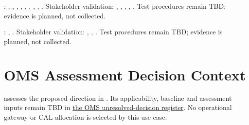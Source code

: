 : , , , , , , , , . Stakeholder validation: , , , , . Test procedures remain TBD; evidence is planned, not collected.

: , . Stakeholder validation: , , . Test procedures remain TBD; evidence is planned, not collected.

\section{OMS Assessment Decision Context}
 assesses the proposed direction in .
Its applicability, baseline and assessment inputs remain TBD in
\hyperref[Table:OMSUnresolvedDecisions]{the OMS unresolved-decision register}.
No operational gateway or CAL allocation is selected by this use case.
